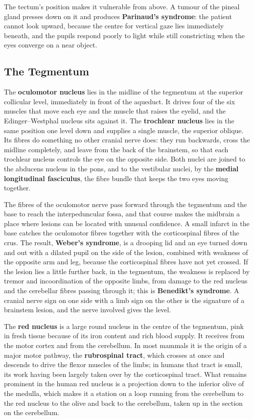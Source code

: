 \documentclass[11pt]{article}
\begin{document}
The tectum's position makes it vulnerable from above. A tumour of the pineal gland presses down on it and produces \textbf{Parinaud's syndrome}: the patient cannot look upward, because the centre for vertical gaze lies immediately beneath, and the pupils respond poorly to light while still constricting when the eyes converge on a near object.

\subsection{The Tegmentum}

The \textbf{oculomotor nucleus} lies in the midline of the tegmentum at the superior collicular level, immediately in front of the aqueduct. It drives four of the six muscles that move each eye and the muscle that raises the eyelid, and the Edinger--Westphal nucleus sits against it. The \textbf{trochlear nucleus} lies in the same position one level down and supplies a single muscle, the superior oblique. Its fibres do something no other cranial nerve does: they run backwards, cross the midline completely, and leave from the back of the brainstem, so that each trochlear nucleus controls the eye on the opposite side. Both nuclei are joined to the abducens nucleus in the pons, and to the vestibular nuclei, by the \textbf{medial longitudinal fasciculus}, the fibre bundle that keeps the two eyes moving together.

The fibres of the oculomotor nerve pass forward through the tegmentum and the base to reach the interpeduncular fossa, and that course makes the midbrain a place where lesions can be located with unusual confidence. A small infarct in the base catches the oculomotor fibres together with the corticospinal fibres of the crus. The result, \textbf{Weber's syndrome}, is a drooping lid and an eye turned down and out with a dilated pupil on the side of the lesion, combined with weakness of the opposite arm and leg, because the corticospinal fibres have not yet crossed. If the lesion lies a little further back, in the tegmentum, the weakness is replaced by tremor and incoordination of the opposite limbs, from damage to the red nucleus and the cerebellar fibres passing through it; this is \textbf{Benedikt's syndrome}. A cranial nerve sign on one side with a limb sign on the other is the signature of a brainstem lesion, and the nerve involved gives the level.

The \textbf{red nucleus} is a large round nucleus in the centre of the tegmentum, pink in fresh tissue because of its iron content and rich blood supply. It receives from the motor cortex and from the cerebellum. In most mammals it is the origin of a major motor pathway, the \textbf{rubrospinal tract}, which crosses at once and descends to drive the flexor muscles of the limbs; in humans that tract is small, its work having been largely taken over by the corticospinal tract. What remains prominent in the human red nucleus is a projection down to the inferior olive of the medulla, which makes it a station on a loop running from the cerebellum to the red nucleus to the olive and back to the cerebellum, taken up in the section on the cerebellum.
\end{document}
